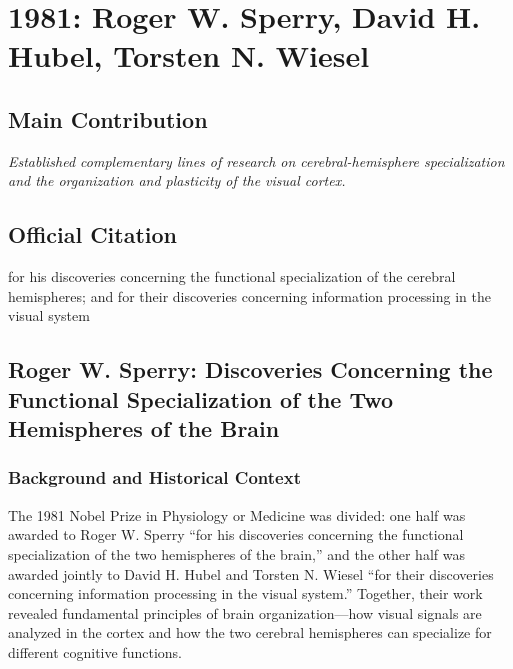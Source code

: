 \chapter[1981 --- Sperry et al.]{1981: Roger W. Sperry, David H. Hubel, Torsten N. Wiesel}
\label{ch:1981_Sperry}

\section*{Main Contribution}

\textit{Established complementary lines of research on cerebral-hemisphere specialization and the organization and plasticity of the visual cortex.}\cite{nobel-1981,lecture-1981,lecture-hubel-1981,lecture-wiesel-1981}

\section{Official Citation}

for his discoveries concerning the functional specialization of the cerebral hemispheres; and for their discoveries concerning information processing in the visual system

\section[Roger W. Sperry: Discoveries]{Roger W. Sperry: Discoveries Concerning the Functional Specialization of the Two Hemispheres of the Brain}

\subsection{Background and Historical Context}

The 1981 Nobel Prize in Physiology or Medicine was divided: one half was awarded to Roger W. Sperry ``for his discoveries concerning the functional specialization of the two hemispheres of the brain,'' and the other half was awarded jointly to David H. Hubel and Torsten N. Wiesel ``for their discoveries concerning information processing in the visual system.'' Together, their work revealed fundamental principles of brain organization---how visual signals are analyzed in the cortex and how the two cerebral hemispheres can specialize for different cognitive functions.

